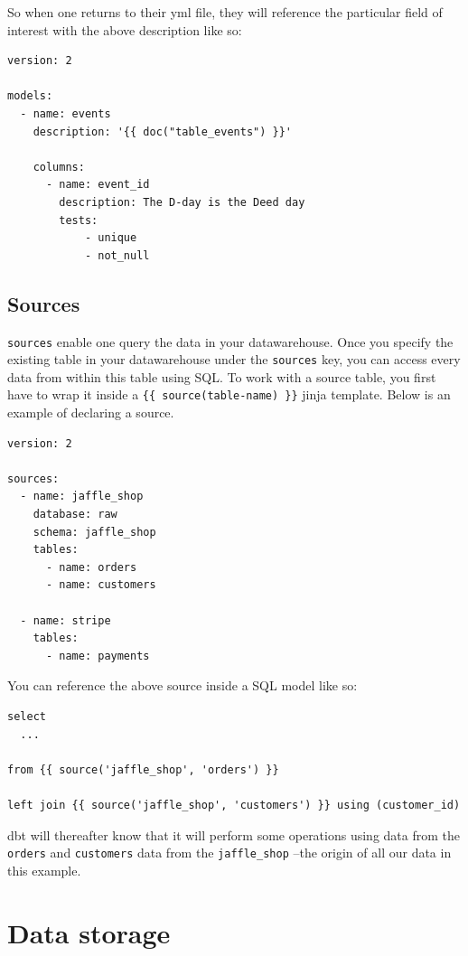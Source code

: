 \documentclass[
]{book}
\begin{document}
So when one returns to their yml file, they will reference the particular field of interest with the above description like so:

\begin{verbatim}
version: 2

models:
  - name: events
    description: '{{ doc("table_events") }}'

    columns:
      - name: event_id
        description: The D-day is the Deed day
        tests:
            - unique
            - not_null
\end{verbatim}

\hypertarget{sources}{%
\section{Sources}\label{sources}}

\texttt{sources} enable one query the data in your datawarehouse. Once you specify the existing table in your datawarehouse under the \texttt{sources} key, you can access every data from within this table using SQL. To work with a source table, you first have to wrap it inside a \texttt{\{\{\ source(table-name)\ \}\}} jinja template. Below is an example of declaring a source.

\begin{verbatim}
version: 2

sources:
  - name: jaffle_shop
    database: raw  
    schema: jaffle_shop  
    tables:
      - name: orders
      - name: customers

  - name: stripe
    tables:
      - name: payments
\end{verbatim}

You can reference the above source inside a SQL model like so:

\begin{verbatim}
select
  ...

from {{ source('jaffle_shop', 'orders') }}

left join {{ source('jaffle_shop', 'customers') }} using (customer_id)

\end{verbatim}

dbt will thereafter know that it will perform some operations using data from the \texttt{orders} and \texttt{customers} data from the \texttt{jaffle\_shop} --the origin of all our data in this example.

\hypertarget{data-storage}{%
\chapter{Data storage}\label{data-storage}}
\end{document}
